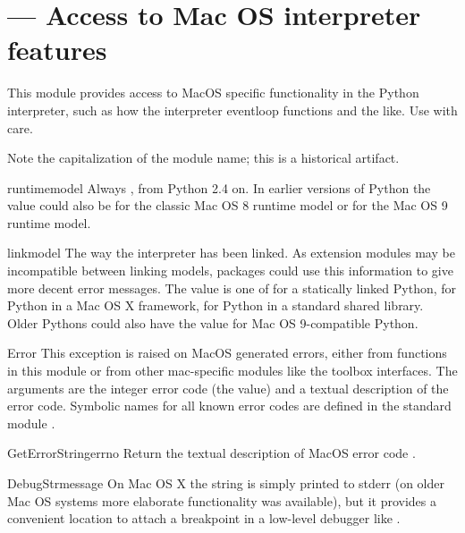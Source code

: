 \section{ ---
         Access to Mac OS interpreter features}



This module provides access to MacOS specific functionality in the
Python interpreter, such as how the interpreter eventloop functions
and the like. Use with care.

Note the capitalization of the module name; this is a historical
artifact.

\begin{datadesc}{runtimemodel}
Always , from Python 2.4 on.
In earlier versions of Python the value could
also be  for the classic Mac OS 8 runtime model or
 for the Mac OS 9 runtime model.
\end{datadesc}

\begin{datadesc}{linkmodel}
The way the interpreter has been linked. As extension modules may be
incompatible between linking models, packages could use this information to give
more decent error messages. The value is one of  for a
statically linked Python,  for Python in a Mac OS X framework,
 for Python in a standard \UNIX{} shared library.
Older Pythons could also have the value
 for Mac OS 9-compatible Python.
\end{datadesc}

\begin{excdesc}{Error}
This exception is raised on MacOS generated errors, either from
functions in this module or from other mac-specific modules like the
toolbox interfaces. The arguments are the integer error code (the
 value) and a textual description of the error code.
Symbolic names for all known error codes are defined in the standard
module .
\end{excdesc}


\begin{funcdesc}{GetErrorString}{errno}
Return the textual description of MacOS error code .
\end{funcdesc}

\begin{funcdesc}{DebugStr}{message }
On Mac OS X the string is simply printed to stderr (on older
Mac OS systems more elaborate functionality was available),
but it provides a convenient location to attach a breakpoint
in a low-level debugger like .
\end{funcdesc}

